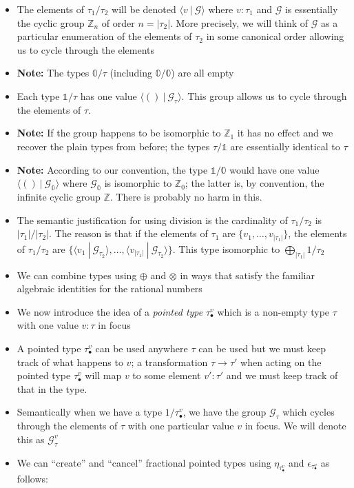 \documentclass{article}
\newcommand{\zt}{\mathbb{0}}
\newcommand{\ot}{\mathbb{1}}
\newcommand{\G}{\mathcal{G}}
\newcommand{\fv}[2]{\langle #1 ~|~ #2 \rangle}
\newcommand{\Z}{\mathbb{Z}}
\newcommand{\pt}[2]{#1_{\bullet}^{#2}}
\begin{document}
\begin{itemize}
\item The elements of $\tau_1/\tau_2$ will be denoted $\fv{v}{\G}$ where $v : \tau_1$ and $\G$ is essentially the cyclic group $\Z_n$ of order $n=|\tau_2|$. More precisely, we will think of $\G$ as a particular enumeration of the elements of $\tau_2$ in some canonical order allowing us to cycle through the elements
\item \textbf{Note:} The types $\zt/\tau$ (including $\zt/\zt$) are all empty
\item Each type $\ot/\tau$ has one value $\fv{()}{\G_\tau}$. This group allows us to cycle through the elements of $\tau$.
\item \textbf{Note:} If the group happens to be isomorphic to $\Z_1$ it has no effect and we recover the plain types from before; the types $\tau/\ot$ are essentially identical to $\tau$
\item \textbf{Note:} According to our convention, the type $\ot/\zt$ would have one value $\fv{()}{\G_\zt}$ where $\G_\zt$ is isomorphic to $\Z_0$; the latter is, by convention, the infinite cyclic group $\Z$. There is probably no harm in this.
\item The semantic justification for using division is the cardinality of $\tau_1/\tau_2$ is $|\tau_1|/|\tau_2|$. The reason is that if the elements of $\tau_1$ are $\{v_1,\ldots,v_{|\tau_1|}\}$, the elements of $\tau_1/\tau_2$ are $\{ \fv{v_1}{\G_{\tau_2}}, \ldots, \fv{v_{|\tau_1|}}{\G_{\tau_2}} \}$. This type isomorphic to $\bigoplus_{|\tau_1|} 1/\tau_2$
\item We can combine types using $\oplus$ and $\otimes$ in ways that satisfy the familiar algebraic identities
for the rational numbers
\item We now introduce the idea of a \emph{pointed type} $\pt{\tau}{v}$ which is a non-empty type $\tau$ with one value $v : \tau$ in focus
\item A pointed type $\pt{\tau}{v}$ can be used anywhere $\tau$ can be used but we must keep track of what happens to $v$; a transformation $\tau \rightarrow \tau'$ when acting on the pointed type $\pt{\tau}{v}$ will map $v$ to some element $v' : \tau'$ and we must keep track of that in the type.
\item Semantically when we have a type $1/\pt{\tau}{v}$, we have the group $\G_\tau$ which cycles through the elements of $\tau$ with one particular value $v$ in focus. We will denote this as $\G_\tau^v$
\item We can ``create'' and ``cancel'' fractional pointed types using $\eta_{\pt{\tau}{v}}$ and $\epsilon_{\pt{\tau}{v}}$ as follows: 

\end{itemize}
\end{document}
